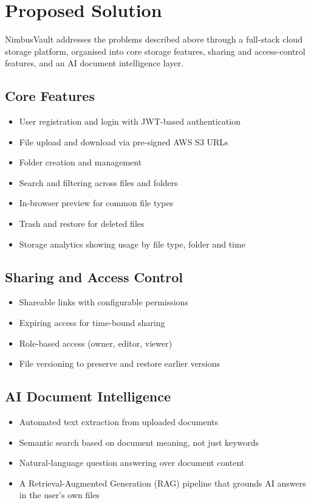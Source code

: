 \documentclass[11pt,a4paper]{article}
\begin{document}
\section{Proposed Solution}

NimbusVault addresses the problems described above through a full-stack cloud storage platform, organised into core storage features, sharing and access-control features, and an AI document intelligence layer.

\subsection{Core Features}
\begin{itemize}[leftmargin=1.2cm, itemsep=3pt]
    \item User registration and login with JWT-based authentication
    \item File upload and download via pre-signed AWS S3 URLs
    \item Folder creation and management
    \item Search and filtering across files and folders
    \item In-browser preview for common file types
    \item Trash and restore for deleted files
    \item Storage analytics showing usage by file type, folder and time
\end{itemize}

\subsection{Sharing and Access Control}
\begin{itemize}[leftmargin=1.2cm, itemsep=3pt]
    \item Shareable links with configurable permissions
    \item Expiring access for time-bound sharing
    \item Role-based access (owner, editor, viewer)
    \item File versioning to preserve and restore earlier versions
\end{itemize}

\subsection{AI Document Intelligence}
\begin{itemize}[leftmargin=1.2cm, itemsep=3pt]
    \item Automated text extraction from uploaded documents
    \item Semantic search based on document meaning, not just keywords
    \item Natural-language question answering over document content
    \item A Retrieval-Augmented Generation (RAG) pipeline that grounds AI answers in the user's own files
\end{itemize}
\end{document}
